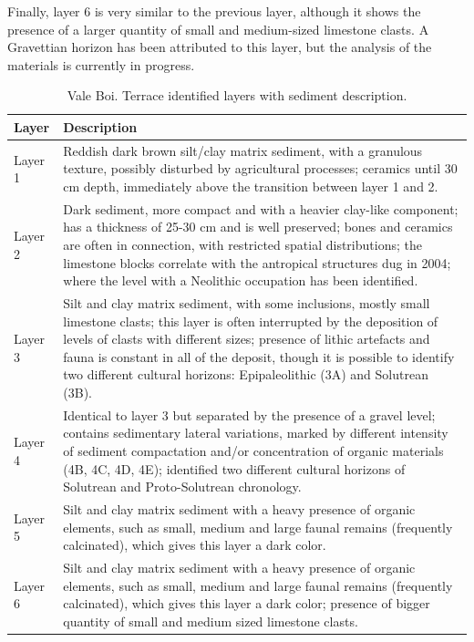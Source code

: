 \documentclass[12pt,twoside]{reedthesis}
\begin{document}
Finally, layer 6 is very similar to the previous layer, although it shows the presence of a larger quantity of small and medium-sized limestone clasts. A Gravettian horizon has been attributed to this layer, but the analysis of the materials is currently in progress.
~
\begin{table}[!h]

\caption{\label{tab:vbstrat}Vale Boi. Terrace identified layers with sediment description.}
\centering
\fontsize{9}{11}\selectfont
\begin{tabular}[t]{>{\raggedright\arraybackslash}p{2cm}>{\raggedright\arraybackslash}p{12cm}}
\toprule
Layer & Description\\
\midrule
Layer 1 & Reddish dark brown silt/clay matrix sediment, with a granulous texture, possibly disturbed by agricultural processes; ceramics until 30 cm depth, immediately above the transition between layer 1 and 2.\\
Layer 2 & Dark sediment, more compact and with a heavier clay-like component; has a thickness of 25-30 cm and is well preserved; bones and ceramics are often in connection, with restricted spatial distributions; the limestone blocks correlate with the antropical structures dug in 2004; where the level with a Neolithic occupation has been identified.\\
Layer 3 & Silt and clay matrix sediment, with some inclusions, mostly small limestone clasts; this layer is often interrupted by the deposition of levels of clasts with different sizes; presence of lithic artefacts and fauna is constant in all of the deposit, though it is possible to identify two different cultural horizons: Epipaleolithic (3A) and Solutrean (3B).\\
Layer 4 & Identical to layer 3 but separated by the presence of a gravel level; contains sedimentary lateral variations, marked by different intensity of sediment compactation and/or concentration of organic materials (4B, 4C, 4D, 4E); identified two different cultural horizons of Solutrean and Proto-Solutrean chronology.\\
Layer 5 & Silt and clay matrix sediment with a heavy presence of organic elements, such as small, medium and large faunal remains (frequently calcinated), which gives this layer a dark color.\\
\addlinespace
Layer 6 & Silt and clay matrix sediment with a heavy presence of organic elements, such as small, medium and large faunal remains (frequently calcinated), which gives this layer a dark color; presence of bigger quantity of small and medium sized limestone clasts.\\
\bottomrule
\end{tabular}
\end{table}
~
\end{document}
